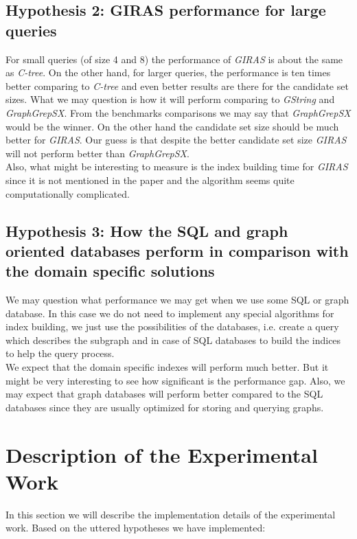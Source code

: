 \subsection{Hypothesis 2: GIRAS performance for large queries}

For small queries (of size 4 and 8) the performance of \textit{GIRAS} is about the same as \textit{C-tree}. On the other hand, for larger queries, the performance is ten times better comparing to \textit{C-tree} and even better results are there for the candidate set sizes. What we may question is how it will perform comparing to \textit{GString} and \textit{GraphGrepSX}. From the benchmarks comparisons we may say that \textit{GraphGrepSX} would be the winner. On the other hand the candidate set size should be much better for \textit{GIRAS}. Our guess is that despite the better candidate set size \textit{GIRAS} will not perform better than \textit{GraphGrepSX}.\\

Also, what might be interesting to measure is the index building time for \textit{GIRAS} since it is not mentioned in the paper and the algorithm seems quite computationally complicated.

\subsection{Hypothesis 3: How the SQL and graph oriented databases perform in comparison with the domain specific solutions}

We may question what performance we may get when we use some SQL or graph database. In this case we do not need to implement any special algorithms for index building, we just use the possibilities of the databases, i.e. create a query which describes the subgraph and in case of SQL databases to build the indices to help the query process.\\

We expect that the domain specific indexes will perform much better. But it might be very interesting to see how significant is the performance gap. Also, we may expect that graph databases will perform better compared to the SQL databases since they are usually optimized for storing and querying graphs.

\section{Description of the Experimental Work}

In this section we will describe the implementation details of the experimental work. Based on the uttered hypotheses we have implemented:

